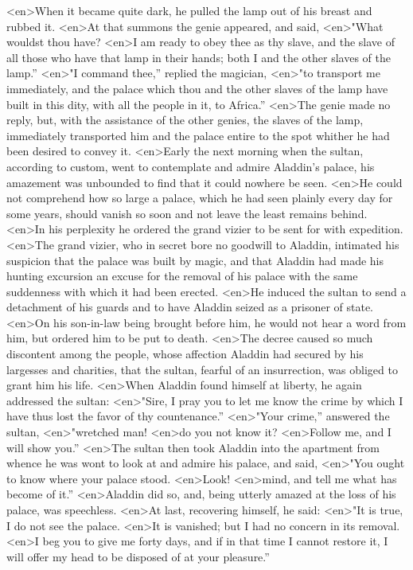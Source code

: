 <en>When it became quite dark, he pulled the lamp out of his breast and rubbed it.
<en>At that summons the genie appeared, and said,
<en>"What wouldst thou have?
<en>I am ready to obey thee as thy slave, and the slave of all those who have that lamp in their hands; both I and the other slaves of the lamp.”
<en>"I command thee,” replied the magician,
<en>"to transport me immediately, and the palace which thou and the other slaves of the lamp have built in this dity, with all the people in it, to Africa.”
<en>The genie made no reply, but, with the assistance of the other genies, the slaves of the lamp, immediately transported him and the palace entire to the spot whither he had been desired to convey it.
<en>Early the next morning when the sultan, according to custom, went to contemplate and admire Aladdin’s palace, his amazement was unbounded to find that it could nowhere be seen.
<en>He could not comprehend how so large a palace, which he had seen plainly every day for some years, should vanish so soon and not leave the least remains behind.
<en>In his perplexity he ordered the grand vizier to be sent for with expedition.
<en>The grand vizier, who in secret bore no goodwill to Aladdin, intimated his suspicion that the palace was built by magic, and that Aladdin had made his hunting excursion an excuse for the removal of his palace with the same suddenness with which it had been erected.
<en>He induced the sultan to send a detachment of his guards and to have Aladdin seized as a prisoner of state.
<en>On his son-in-law being brought before him, he would not hear a word from him, but ordered him to be put to death.
<en>The decree caused so much discontent among the people, whose affection Aladdin had secured by his largesses and charities, that the sultan, fearful of an insurrection, was obliged to grant him his life.
<en>When Aladdin found himself at liberty, he again addressed the sultan:
<en>"Sire, I pray you to let me know the crime by which I have thus lost the favor of thy countenance.”
<en>"Your crime,” answered the sultan,
<en>"wretched man!
<en>do you not know it?
<en>Follow me, and I will show you.”
<en>The sultan then took Aladdin into the apartment from whence he was wont to look at and admire his palace, and said,
<en>"You ought to know where your palace stood.
<en>Look!
<en>mind, and tell me what has become of it.”
<en>Aladdin did so, and, being utterly amazed at the loss of his palace, was speechless.
<en>At last, recovering himself, he said:
<en>"It is true, I do not see the palace.
<en>It is vanished; but I had no concern in its removal.
<en>I beg you to give me forty days, and if in that time I cannot restore it, I will offer my head to be disposed of at your pleasure.”
